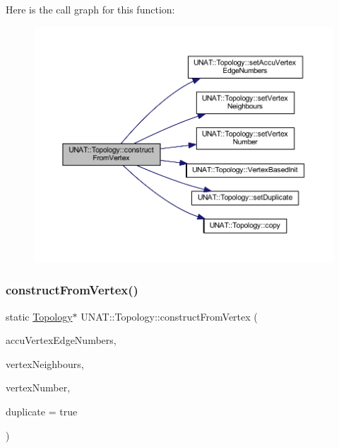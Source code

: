 Here is the call graph for this function\+:
\nopagebreak
\begin{figure}[H]
\begin{center}
\leavevmode
\includegraphics[width=350pt]{classUNAT_1_1Topology_aebafdfdace5d76dbfc354183a3cddee5_cgraph}
\end{center}
\end{figure}
\mbox{\label{classUNAT_1_1Topology_a01e9873d9c9d7b585632a4fcef1bbd57}} 
\subsubsection{\texorpdfstring{constructFromVertex()}{constructFromVertex()}\hspace{0.1cm}{\footnotesize\ttfamily [3/3]}}
{\footnotesize\ttfamily static \mbox{\hyperlink{classUNAT_1_1Topology}{Topology}}$\ast$ U\+N\+A\+T\+::\+Topology\+::construct\+From\+Vertex (\begin{DoxyParamCaption}\item[{\mbox{\hyperlink{include_2swMacro_8h_a113cf5f6b5377cdf3fac6aa4e443e9aa}{sw\+Int}} $\ast$}]{accu\+Vertex\+Edge\+Numbers,  }\item[{\mbox{\hyperlink{include_2swMacro_8h_a113cf5f6b5377cdf3fac6aa4e443e9aa}{sw\+Int}} $\ast$}]{vertex\+Neighbours,  }\item[{\mbox{\hyperlink{include_2swMacro_8h_a113cf5f6b5377cdf3fac6aa4e443e9aa}{sw\+Int}}}]{vertex\+Number,  }\item[{bool}]{duplicate = {\ttfamily true} }\end{DoxyParamCaption})\hspace{0.3cm}{\ttfamily [static]}}

